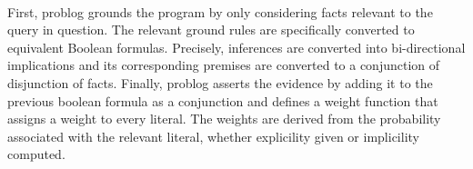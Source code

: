\paragraph{}
First, problog grounds the program by only considering facts relevant to the query in question. 
The relevant ground rules are specifically converted to equivalent Boolean formulas. 
Precisely, inferences are converted into bi-directional implications and its corresponding premises 
are converted to a conjunction of disjunction of facts. 
Finally, problog asserts the evidence by adding it to the previous boolean formula 
as a conjunction and defines a weight function that assigns a weight to every literal. 
The weights are derived from the probability associated with the relevant literal, whether explicility 
given or implicility computed. 

